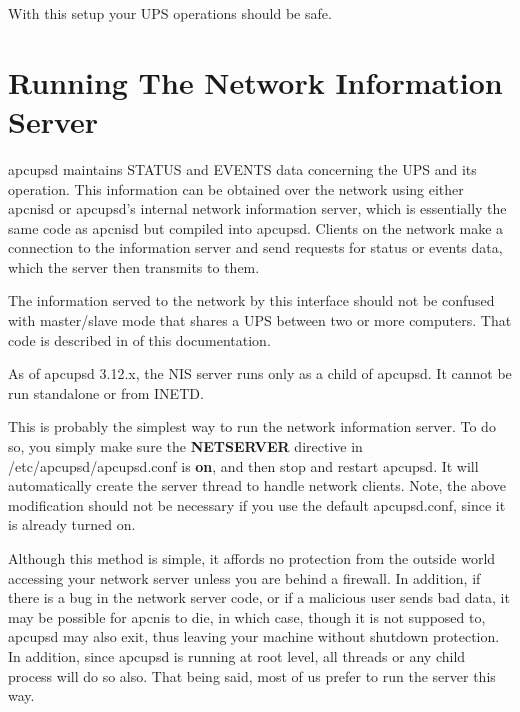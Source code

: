 {{{{{{{With this setup your UPS operations should be safe. 


\label{Running-The-Network-Information-Server}

\section*{Running The Network Information Server}

apcupsd maintains STATUS and EVENTS data concerning the UPS and its operation.
This information can be obtained over the network using either apcnisd or
apcupsd's internal network information server, which is essentially the same
code as apcnisd but compiled into apcupsd. Clients on the network make a
connection to the information server and send requests for status or events
data, which the server then transmits to them.  

The information served to the network by this interface should not be confused
with master/slave mode that shares a UPS between two or more computers. That
code is described in  of this
documentation.  

As of apcupsd 3.12.x, the NIS server runs only as a child of apcupsd.
It cannot be run standalone or from INETD.

This is probably the simplest way to run the network information server. To do
so, you simply make sure the {\bf NETSERVER} directive in
/etc/apcupsd/apcupsd.conf is {\bf on}, and then stop and restart apcupsd. It
will automatically create the server thread to handle network clients. 
Note, the above modification should not be necessary if you use the default
apcupsd.conf, since it is already turned on.  

Although this method is simple, it affords no protection from the outside
world accessing your network server unless you are behind a firewall. In
addition, if there is a bug in the network server code, or if a malicious user
sends bad data, it may be possible for apcnis to die, in which case, though it
is not supposed to, apcupsd may also exit, thus leaving your machine without
shutdown protection. In addition, since apcupsd is running at root level, all
threads or any child process will do so also. That being said, most of us
prefer to run the server this way.  

}}}}}}}
